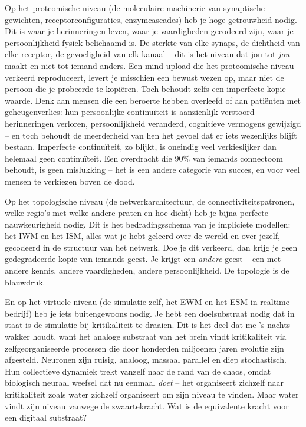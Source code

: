 \documentclass[11pt, twoside, openright]{book}
\begin{document}
Op het proteomische niveau (de moleculaire machinerie van synaptische gewichten, receptorconfiguraties, enzymcascades) heb je hoge getrouwheid nodig. Dit is waar je herinneringen leven, waar je vaardigheden gecodeerd zijn, waar je persoonlijkheid fysiek belichaamd is. De sterkte van elke synaps, de dichtheid van elke receptor, de gevoeligheid van elk kanaal -- dit is het niveau dat jou tot \textit{jou} maakt en niet tot iemand anders. Een mind upload die het proteomische niveau verkeerd reproduceert, levert je misschien een bewust wezen op, maar niet de persoon die je probeerde te kopiëren. Toch behoudt zelfs een imperfecte kopie waarde. Denk aan mensen die een beroerte hebben overleefd of aan patiënten met geheugenverlies: hun persoonlijke continuïteit is aanzienlijk verstoord -- herinneringen verloren, persoonlijkheid veranderd, cognitieve vermogens gewijzigd -- en toch behoudt de meerderheid van hen het gevoel dat er iets wezenlijks blijft bestaan. Imperfecte continuïteit, zo blijkt, is oneindig veel verkieslijker dan helemaal geen continuïteit. Een overdracht die 90\% van iemands connectoom behoudt, is geen mislukking -- het is een andere categorie van succes, en voor veel mensen te verkiezen boven de dood.

Op het topologische niveau (de netwerkarchitectuur, de connectiviteitspatronen, welke regio's met welke andere praten en hoe dicht) heb je bijna perfecte nauwkeurigheid nodig. Dit is het bedradingsschema van je impliciete modellen: het IWM en het ISM, alles wat je hebt geleerd over de wereld en over jezelf, gecodeerd in de structuur van het netwerk. Doe je dit verkeerd, dan krijg je geen gedegradeerde kopie van iemands geest. Je krijgt een \textit{andere} geest -- een met andere kennis, andere vaardigheden, andere persoonlijkheid. De topologie is de blauwdruk.

En op het virtuele niveau (de simulatie zelf, het EWM en het ESM in realtime bedrijf) heb je iets buitengewoons nodig. Je hebt een doelsubstraat nodig dat in staat is de simulatie bij kritikaliteit te draaien. Dit is het deel dat me 's nachts wakker houdt, want het analoge substraat van het brein vindt kritikaliteit via zelfgeorganiseerde processen die door honderden miljoenen jaren evolutie zijn afgesteld. Neuronen zijn ruisig, analoog, massaal parallel en diep stochastisch. Hun collectieve dynamiek trekt vanzelf naar de rand van de chaos, omdat biologisch neuraal weefsel dat nu eenmaal \textit{doet} -- het organiseert zichzelf naar kritikaliteit zoals water zichzelf organiseert om zijn niveau te vinden. Maar water vindt zijn niveau vanwege de zwaartekracht. Wat is de equivalente kracht voor een digitaal substraat?
\end{document}
